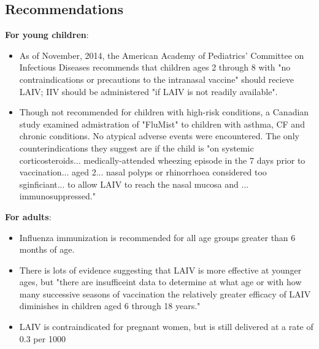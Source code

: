 \documentclass[11pt]{article}
\begin{document}
{}
\begin{multicols}{2} 

\subsection*{Recommendations}
\textbf{For young children}:
\begin{itemize}
\item As of November, 2014, the American Academy of Pediatrics' Committee on Infectious Diseases recommends that children ages 2 through 8 with "no contraindications or precautions to the intranasal vaccine" should recieve LAIV; IIV should be administered "if LAIV is not readily available". \cite{peds2014}
\item Though not recommended for children with high-risk conditions, a Canadian study examined admistration of "FluMist" to children with asthma, CF and chronic conditions.  No atypical adverse events were encountered.  The only counterindications they suggest are if the child is "on systemic corticosteroids... medically-attended wheezing episode in the 7 days prior to vaccination... aged 2... nasal polyps or rhinorrhoea considered too sginficiant... to allow LAIV to reach the nasal mucosa and ... immunosuppressed." \cite{Quach2014} 
\end{itemize}


\textbf{For adults}:
\begin{itemize}
\item Influenza immunization is recommended for all age groups greater than 6 months of age. \cite{cdcrec2014}
\item There is lots of evidence suggesting that LAIV is more effective at younger ages, but "there are insufficeint data to determine at what age or with how many successive seasons of vaccination the relatively greater efficacy of LAIV diminishes in children aged 6 through 18 years." \cite{cdcrec2014}
\item LAIV is contraindicated for pregnant women, but is still delivered at a rate of 0.3 per 1000 \cite{Naleway2014}
\end{itemize}




\end{multicols}
\end{document}
